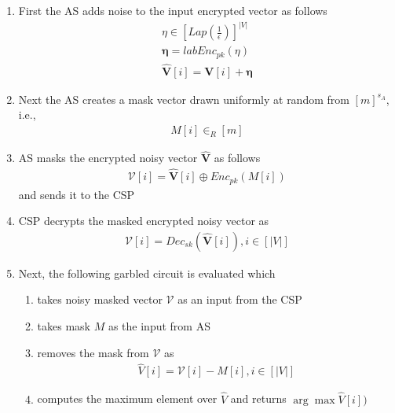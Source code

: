 \begin{enumerate}
\begin{enumerate}
\item First the AS adds noise to the input encrypted vector as follows \begin{gather*} \eta \in [Lap(\frac{1}{\epsilon})]^{|V|}\\\boldsymbol{\eta}=labEnc_{pk}(\eta)\\\mathbf{\hat{{V}}}[i]=\mathbf{V}[i]+ \boldsymbol{\eta} \end{gather*} \item Next the AS creates a mask vector drawn uniformly at random from $[m]^{s_A}$, i.e.,  \begin{gather} M[i] \in_R [m]\end{gather} \item AS masks the encrypted noisy vector $\mathbf{\hat{V}}$  as follows \begin{gather}\boldsymbol{\mathcal{V}}[i]= \mathbf{\hat{V}}[i] \oplus Enc_{pk}(M[i])\end{gather} and sends it to the CSP \item CSP decrypts the masked encrypted noisy vector as \begin{gather*}\mathcal{V}[i]=Dec_{sk}(\mathbf{\hat{V}}[i]), i \in [|V|]\end{gather*} \item Next, the following garbled circuit is evaluated which
    \begin{enumerate}[label=(\alph*)]\item takes noisy masked  vector $\mathcal{V}$ as an input from the CSP \item takes mask $M$ as the input from AS  \item removes the mask from  $\mathcal{V}$  as \begin{gather*} \hat{V}[i]=\mathcal{V}[i]-M[i], i \in [|V|]\end{gather*}  \item computes the maximum element over  $\hat{V}$ and returns $\arg\max{\hat{V}[i])}$
    \end{enumerate} \end{enumerate}\end{enumerate}
